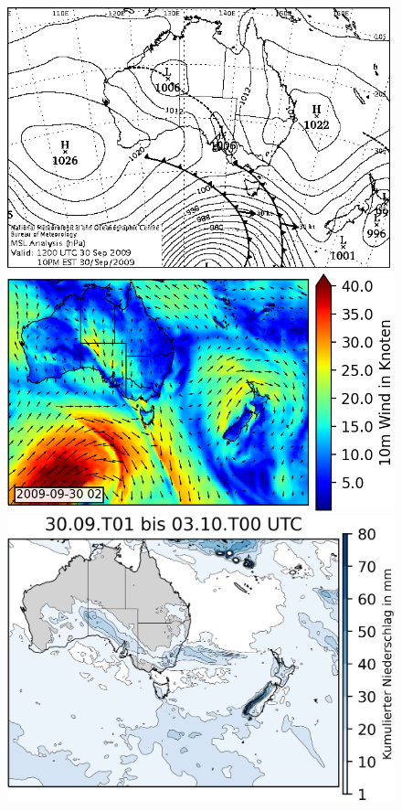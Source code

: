 \documentclass[12pt,a4paper,onecolumn,headheight=30pt]{scrartcl}
\begin{document}
\begin{figure}[htbp]
	\begin{minipage}[c]{0.3\textwidth}
		\includegraphics[width=\textwidth]{bilder/20090930T12_msl.png}
	\end{minipage}\hfill
	\begin{minipage}[c]{0.35\textwidth}
		\includegraphics[width=\textwidth]{bilder/wind_october_small.png}
	\end{minipage}\hfill
	\begin{minipage}[c]{0.33\textwidth}
		\includegraphics[width=\textwidth]{bilder/rain_october_small.png}

\end{minipage}
\end{figure}
\end{document}
